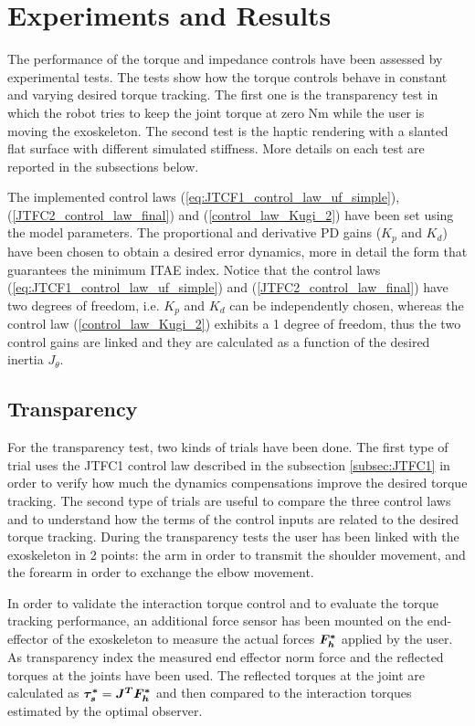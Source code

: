 
\section{Experiments and Results} \label{sec:experimentsResults}

The performance of the torque and impedance controls have been assessed by experimental tests. 
The tests show how the torque controls behave in constant and varying desired torque tracking.
The first one is the transparency test in which the robot tries to keep the joint torque at zero Nm while the user is moving the exoskeleton.
The second test is the haptic rendering with a slanted flat surface with different simulated stiffness.
More details on each test are reported in the subsections below.
\par The implemented control laws (\ref{eq:JTCF1_control_law_uf_simple}), (\ref{JTFC2_control_law_final}) and (\ref{control_law_Kugi_2}) have been set using the model parameters. The proportional and derivative PD gains ($K_p$ and $K_d$) have been chosen to obtain a desired error dynamics, more in detail the form that guarantees the minimum ITAE index. Notice that the control laws (\ref{eq:JTCF1_control_law_uf_simple}) and (\ref{JTFC2_control_law_final}) have two degrees of freedom, i.e. $K_p$ and $K_d$ can be independently chosen, whereas the control law (\ref{control_law_Kugi_2}) exhibits a 1 degree of freedom, thus the two control gains are linked and they are calculated as a function of the desired inertia $J_{\theta}$.

\subsection{Transparency} \label{subsec:transparency}

For the transparency test, two kinds of trials have been done.
The first type of trial uses the JTFC1 control law described in the subsection \ref{subsec:JTFC1} in order to verify how much the dynamics compensations improve the desired torque tracking.
The second type of trials are useful to compare the three control laws and to understand how the terms of the control inputs are related to the desired torque tracking.
During the transparency tests the user has been linked with the exoskeleton in 2 points: the arm in order to transmit the shoulder movement, and the forearm in order to exchange the elbow movement.
\par In order to validate the interaction torque control and to evaluate the torque tracking performance, an additional force sensor has been mounted on the end-effector of the exoskeleton to measure the actual forces ${ \boldsymbol {F_h^*}}$  applied by the user. 
As transparency index the measured end effector norm force and the reflected torques at the joints have been used.
The reflected torques at the joint are calculated as ${ \boldsymbol {\tau_s^*}}={ \boldsymbol {J^T F_h^*}}$ and then compared to the interaction torques estimated by the optimal observer.


